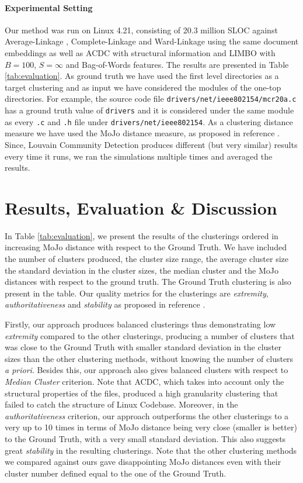 \documentclass[sigconf,review, anonymous]{acmart}
\begin{document}
\paragraph{Experimental Setting} Our method was run on Linux 4.21,
consisting of 20.3 million SLOC against Average-Linkage \cite{average}, Complete-Linkage \cite{complete} 
and Ward-Linkage \cite{ward} using the same document embeddings
as well as ACDC with structural information \cite{acdc} and LIMBO \cite{limbo} with $B = 100$, $S = \infty$ and Bag-of-Words features. The results are presented in Table \ref{tab:evaluation}. 
As ground truth we have used the first level directories as a target clustering and as input we have considered 
the modules of the one-top directories. 
For example, the source code file \texttt{drivers/net/ieee802154\-/mcr20a.c} has a ground truth value of \texttt{drivers} 
and it is considered under the same module as every \texttt{.c} and \texttt{.h} file under \texttt{drivers/net/ieee802154}. 
As a clustering distance measure we have used the MoJo distance measure, as proposed in reference \cite{mojo}. 
Since, Louvain Community Detection produces  different (but very similar) results every time it runs, we ran the simulations 
multiple times and averaged the results. 

\section{Results, Evaluation \& Discussion}

In Table \ref{tab:evaluation}, we present the results of the clusterings ordered in increasing MoJo distance 
with respect to the Ground Truth. 
We have included the number of clusters produced, the cluster size range, the average cluster size the standard
deviation in the cluster sizes, the median cluster and the MoJo distances with respect to the ground truth. 
The Ground Truth clustering is also present in the table. 
Our quality metrics for the clusterings are 
\emph{extremity}, \emph{authoritativeness} and \emph{stability} as proposed in reference \cite{evaluation}.

Firstly, our approach produces balanced clusterings thus demonstrating low \emph{extremity} compared to the other clusterings, 
producing a number of clusters that was close to the Ground Truth with smaller standard deviation in the cluster sizes than 
the other clustering methods, without knowing the number of clusters \emph{a priori}. 
Besides this, our approach also gives balanced clusters with respect to \emph{Median Cluster} criterion. 
Note that ACDC, which takes into account only the structural properties of the files, produced a high 
granularity clustering that failed to catch the structure of Linux Codebase. 
Moreover, in the \emph{authoritativeness} criterion, our approach outperforms the other clusterings to a very up to 10 times 
in terms of MoJo distance being very close (smaller is better) to the Ground Truth, with a very small standard deviation. 
This also suggests great \emph{stability} in the resulting clusterings. 
Note that the other clustering methods we compared against ours gave disappointing MoJo distances even with their cluster
number defined equal to the one of the Ground Truth. 
\end{document}
